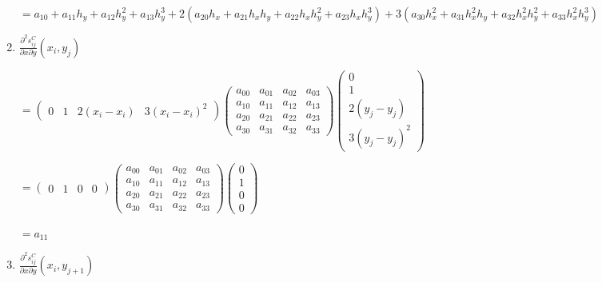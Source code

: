 \documentclass[11pt]{article}
\begin{document}
\begin{enumerate}[label=\textbf{\arabic*)}]
\begin{flushleft}
    $= a_{10} + a_{11}h_y + a_{12}h_y^2 + a_{13}h_y^3 + 2(a_{20}h_x + a_{21}h_xh_y + a_{22}h_xh_y^2 + a_{23}h_xh_y^3) + 3(a_{30}h_x^2 + a_{31}h_x^2h_y + a_{32}h_x^2h_y^2 + a_{33}h_x^2h_y^3)$
    \end{flushleft}

    \item $\frac{\partial^2 s_{ij}^C}{\partial x \partial y}(x_i, y_j)$

    \begin{flushleft}
    $= \begin{pmatrix}
      0 & 1 & 2(x_i - x_i) & 3(x_i - x_i)^2
    \end{pmatrix}
    \begin{pmatrix}
      a_{00}  & a_{01} & a_{02} & a_{03} \\
      a_{10}  & a_{11} & a_{12} & a_{13} \\
      a_{20}  & a_{21} & a_{22} & a_{23} \\
      a_{30}  & a_{31} & a_{32} & a_{33}
    \end{pmatrix}
    \begin{pmatrix}
      0  \\
      1 \\
      2(y_j - y_j)  \\
      3(y_j - y_j)^2
    \end{pmatrix}$


    $= \begin{pmatrix}
      0 & 1 & 0 & 0
    \end{pmatrix}
    \begin{pmatrix}
      a_{00}  & a_{01} & a_{02} & a_{03} \\
      a_{10}  & a_{11} & a_{12} & a_{13} \\
      a_{20}  & a_{21} & a_{22} & a_{23} \\
      a_{30}  & a_{31} & a_{32} & a_{33}
    \end{pmatrix}
    \begin{pmatrix}
      0  \\
      1  \\
      0  \\
      0
    \end{pmatrix}$

    $= a_{11}$
    \end{flushleft}

    \item $\frac{\partial^2 s_{ij}^C}{\partial x \partial y}(x_i, y_{j + 1})$


\end{enumerate}
\end{document}
